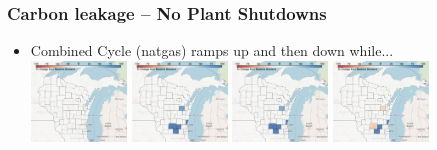 \documentclass[xcolor=dvipsnames]{beamer}
\begin{document}
\begin{frame}
  \frametitle{Carbon leakage -- No Plant Shutdowns}
\begin{itemize}

  \item Combined Cycle (natgas) ramps up and then down while... \\
  \includegraphics[width=0.2\textwidth]{includes/no_leakage_no_shutdowns_CC_r0.png}
  \includegraphics[width=0.2\textwidth]{includes/no_leakage_no_shutdowns_CC_r2.png}
  \includegraphics[width=0.2\textwidth]{includes/no_leakage_no_shutdowns_CC_r3.png}
  \includegraphics[width=0.2\textwidth]{includes/no_leakage_no_shutdowns_CC_r4.png}




\end{itemize}
\end{frame}
\end{document}
